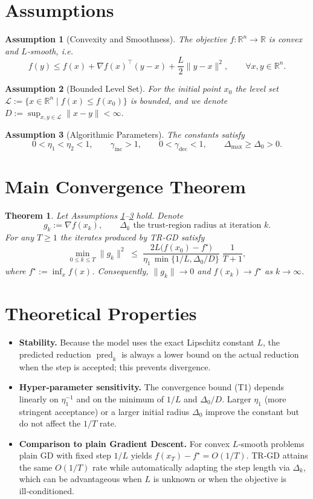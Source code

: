 \documentclass{article}
\newtheorem{assumption}{Assumption}
\newtheorem{theorem}{Theorem}
\newcommand{\R}{\mathbb{R}}
\begin{document}
\section*{Assumptions}
\begin{assumption}[Convexity and Smoothness]\label{as:convex}
The objective $f:\R^{n}\!\to\!\R$ is convex and $L$‑smooth, i.e.
\[
f(y)\le f(x)+\nabla f(x)^{\top}(y-x)+\frac{L}{2}\|y-x\|^{2},
\qquad\forall x,y\in\R^{n}.
\]
\end{assumption}
\begin{assumption}[Bounded Level Set]\label{as:bounded}
For the initial point $x_0$ the level set
$\mathcal{L}:=\{x\in\R^{n}\mid f(x)\le f(x_0)\}$ is bounded, and we denote
$D:=\sup_{x,y\in\mathcal{L}}\|x-y\|<\infty$.
\end{assumption}
\begin{assumption}[Algorithmic Parameters]\label{as:param}
The constants satisfy
\[
0<\eta_1<\eta_2<1,\qquad
\gamma_{\text{inc}}>1,\qquad
0<\gamma_{\text{dec}}<1,\qquad
\Delta_{\max}\ge \Delta_0>0 .
\]
\end{assumption}

\section*{Main Convergence Theorem}
\begin{theorem}\label{thm:rate}
Let Assumptions \ref{as:convex}–\ref{as:param} hold.  Denote
\[
g_k:=\nabla f(x_k),\qquad 
\Delta_k\text{ the trust‑region radius at iteration }k .
\]
For any $T\ge 1$ the iterates produced by TR‑GD satisfy
\[
\min_{0\le k\le T}\|g_k\|^{2}\;\le\;
\frac{2L\bigl(f(x_0)-f^{\star}\bigr)}{\eta_1\,\min\{1/L,\Delta_0/D\}}\;\frac{1}{T+1},
\tag{T1}
\]
where $f^{\star}:=\inf_{x}f(x)$.  Consequently,
$\|g_k\|\to0$ and $f(x_k)\to f^{\star}$ as $k\to\infty$.
\end{theorem}

\section*{Theoretical Properties}
\begin{itemize}
\item \textbf{Stability.}  Because the model uses the exact Lipschitz constant
$L$, the predicted reduction $\operatorname{pred}_k$ is always a lower bound on
the actual reduction when the step is accepted; this prevents divergence.
\item \textbf{Hyper‑parameter sensitivity.}
The convergence bound (T1) depends linearly on $\eta_1^{-1}$ and on the
minimum of $1/L$ and $\Delta_0/D$.  Larger $\eta_1$ (more stringent acceptance)
or a larger initial radius $\Delta_0$ improve the constant but do not affect the
$1/T$ rate.
\item \textbf{Comparison to plain Gradient Descent.}
For convex $L$‑smooth problems plain GD with fixed step $1/L$ yields
$f(x_T)-f^{\star}=O(1/T)$.  TR‑GD attains the same $O(1/T)$ rate while
automatically adapting the step length via $\Delta_k$, which can be advantageous
when $L$ is unknown or when the objective is ill‑conditioned.
\end{itemize}
\end{document}
